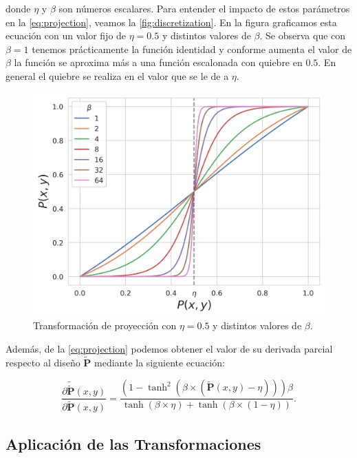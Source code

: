 \noindent donde $\eta$ y $\beta$ son números escalares. Para entender el impacto de estos parámetros
en la \autoref{eq:projection}, veamos la \autoref{fig:discretization}.
En la figura graficamos esta ecuación con un valor fijo de $\eta = 0.5$ y distintos valores de
$\beta$.
Se observa que con $\beta = 1$ tenemos prácticamente la función identidad y conforme aumenta
el valor de $\beta$ la función se aproxima más a una función escalonada con quiebre en $0.5$. 
En general el quiebre se realiza en el valor que se le de a $\eta$.

    \begin{figure}[ht]
      \centering
      \includegraphics[scale=0.75]{image/theory/discretization.png}
      \caption{Transformación de proyección con $\eta = 0.5$ y distintos valores
      de $\beta$.}
      \label{fig:discretization}
    \end{figure}

Además, de la \autoref{eq:projection} podemos obtener el valor de su derivada parcial 
respecto al diseño $\widetilde{\boldsymbol{P}}$ mediante la siguiente ecuación:

\begin{equation}
  \frac{\partial\widetilde{\widetilde{\boldsymbol{P}}}(x, y)}{\partial \widetilde{\boldsymbol{P}}(x, y)} =
  \frac{(1 - \tanh^2 (\beta \times (\widetilde{\boldsymbol{P}}(x, y) - \eta))) \beta}
       {\tanh (\beta \times \eta) + \tanh (\beta \times (1 - \eta))}.
  \label{eq:projection-grad}
\end{equation}

\subsection{Aplicación de las Transformaciones}

